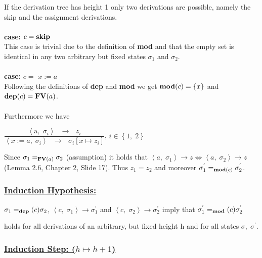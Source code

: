 \documentclass[12pt]{scrartcl}
\newcommand{\eRelation}[2]{$\dfrac{\text{#1}}{\text{#2}}$}
\newcommand{\eState}[2]{$\left\langle \text{#1},\; \text{#2}\right\rangle$}
\newcommand{\eRule}[3]{\eState{#1}{#2} $\rightarrow$ #3}
\newcommand{\Mod}[0]{\text{\textbf{mod}}}
\newcommand{\dep}[0]{\text{\textbf{dep}}}
\newcommand{\FV}[0]{\text{\textbf{FV}}}
\begin{document}
	\indent\indent If the derivation tree has height 1 only two derivations are possible, namely \indent the skip and the assignment derivations.\\\\
	\indent \textbf{case:} $c=\text{\textbf{skip}}$\\
	\indent\indent This case is trivial due to the definition of \textbf{mod} and that the empty set is \indent\indent identical in any two arbitrary but fixed states $\sigma_{1}$ and $\sigma_{2}$.\\\\
	\indent \textbf{case:} $c=$ {\boldmath$x:=a$}\\
	\indent\indent Following the definitions of \textbf{dep} and \textbf{mod} we get $\Mod(c)=\left\lbrace x\right\rbrace$ and \\\indent\indent $\dep(c)=\FV(a)$.\\\\
	\indent\indent Furthermore we have
	\begin{center}
		\eRelation
			{\eRule{a}{$\sigma_{i}$}{$z_{i}$}}
			{\eRule{$x:=a$}{$\sigma_{i}$}{$\sigma_{i}\left[ x\mapsto z_{i}\right]$}}, $i\in \left\lbrace 1,\; 2\right\rbrace$\\
	\end{center}
	\indent\indent\indent Since $\sigma_{1}=_{\FV(a)}\sigma_{2}$ (assumption) it holds that $\left\langle a,\; \sigma_{1}\right\rangle\rightarrow z \Leftrightarrow \left\langle a,\; \sigma_{2}\right\rangle\rightarrow z$ \indent\indent(Lemma 2.6, Chapter 2, Slide 17). Thus $z_{1}=z_{2}$ and moreover $\sigma^{'}_{1}=_{\Mod(c)}\sigma^{'}_{2}$.
	
	\subsubsection*{\underline{Induction Hypothesis:}}
	
	\begin{center}
		$\sigma_{1} =_\dep(c) \sigma_{2}$, $\left\langle c,\; \sigma_{1} \right\rangle \rightarrow \sigma^{'}_{1}$ and $\left\langle c, \; \sigma_{2}\right\rangle \rightarrow \sigma^{'}_{2}$ imply that $\sigma^{'}_{1} =_\Mod(c)\sigma^{'}_{2}$
	\end{center}
	\indent\indent holds for all derivations of an arbitrary, but fixed height h and for all states \indent$\sigma,\; \sigma^{'}$.
	
\newpage	
	
	\subsubsection*{\underline{Induction Step: ({\boldmath$h\mapsto h+1$})}}
	
\end{document}
